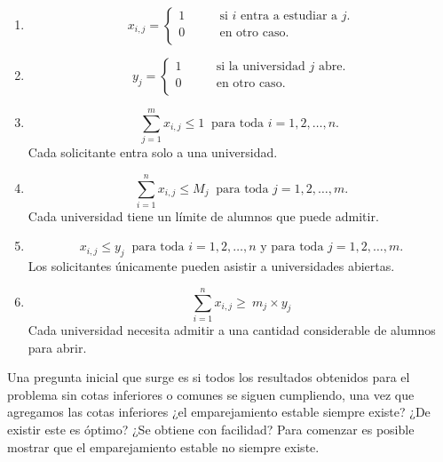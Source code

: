 \begin{enumerate}
\item \begin{equation} \label{2r1}
x_{i,j}= 
\begin{cases}
1 & \qquad \text{si $i$ entra a estudiar a $j$.} \\
0 &\qquad\text{en otro caso.}\ \\ 
\end{cases} \end{equation}
\item \begin{equation} y_{j}= 
\begin{cases}
1 & \qquad \text{si la universidad $j$ abre.} \\
0 &\qquad\text{en otro caso.} \\ 
\end{cases} \end{equation}
\item \begin{equation} \label{2r2}
\sum_{j=1}^{m}x_{i,j} \leq1 \ \text{ para toda $i=1,2,\ldots,n$. }
\end{equation} Cada solicitante entra solo a una universidad. 
\item \begin{equation} \label{2r3}
\sum_{i=1}^{n} x_{i,j} \leq M_j\ \text{ para toda $j=1,2,\dots,m$.} 
\end{equation}
Cada universidad tiene un límite de alumnos que puede admitir. 
\item \begin{equation} \label{r6}
x_{i,j} \leq y_j \ \text{ para toda $i=1,2,\ldots,n$ y para toda $j=1,2,\ldots,m$.}
\end{equation}
Los solicitantes únicamente pueden asistir a universidades abiertas.
\item \begin{equation} \label{r4}
\sum_{i=1}^{n} x_{i,j} \geq\ m_j\times y_j 
\end{equation}
Cada universidad necesita admitir a una cantidad considerable de alumnos para abrir.
\end{enumerate}

Una pregunta inicial que surge es si todos los resultados obtenidos para el problema sin cotas inferiores o comunes se siguen cumpliendo, una vez que agregamos las cotas inferiores ¿el emparejamiento estable siempre existe? ¿De existir este es óptimo? ¿Se obtiene con facilidad? Para comenzar es posible mostrar que el emparejamiento estable no siempre existe.

